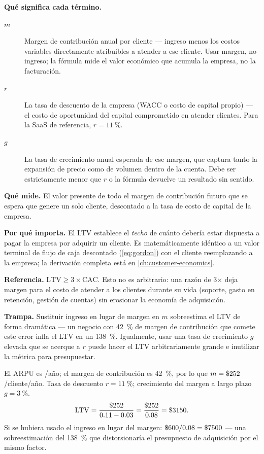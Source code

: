 \textbf{Qué significa cada término.}
\begin{description}
  \item[$m$] Margen de contribución anual por cliente --- ingreso menos los costos variables
    directamente atribuibles a atender a ese cliente. Usar margen, no ingreso; la fórmula
    mide el valor económico que acumula la empresa, no la facturación.
  \item[$r$] La tasa de descuento de la empresa (WACC o costo de capital propio) --- el
    costo de oportunidad del capital comprometido en atender clientes. Para la SaaS de
    referencia, $r = \qty{11}{\percent}$.
  \item[$g$] La tasa de crecimiento anual esperada de ese margen, que captura tanto la
    expansión de precio como de volumen dentro de la cuenta. Debe ser estrictamente menor
    que $r$ o la fórmula devuelve un resultado sin sentido.
\end{description}

\textbf{Qué mide.} El valor presente de todo el margen de contribución futuro que se espera
que genere un solo cliente, descontado a la tasa de costo de capital de la empresa.

\textbf{Por qué importa.} El LTV establece el \emph{techo} de cuánto debería estar dispuesta
a pagar la empresa por adquirir un cliente. Es matemáticamente idéntico a un valor terminal
de flujo de caja descontado (\cref{eq:gordon}) con el cliente reemplazando a la empresa; la
derivación completa está en \cref{ch:customer-economics}.

\textbf{Referencia.} $\mathrm{LTV} \ge 3 \times \mathrm{CAC}$. Esto no es arbitrario: una
razón de 3$\times$ deja margen para el costo de atender a los clientes durante su vida
(soporte, gasto en retención, gestión de cuentas) sin erosionar la economía de adquisición.

\textbf{Trampa.} Sustituir ingreso en lugar de margen en $m$ sobreestima el LTV de forma
dramática --- un negocio con \qty{42}{\percent} de margen de contribución que comete este
error infla el LTV en un \qty{138}{\percent}. Igualmente, usar una tasa de crecimiento $g$
elevada que se acerque a $r$ puede hacer el LTV arbitrariamente grande e inutilizar la
métrica para presupuestar.

\begin{example}
El ARPU es /año; el margen de contribución es \qty{42}{\percent}, por lo que $m =
\$\num{252}$/cliente/año. Tasa de descuento $r = \qty{11}{\percent}$; crecimiento del margen
a largo plazo $g = \qty{3}{\percent}$.
\[
  \mathrm{LTV} = \frac{\$\num{252}}{0.11 - 0.03} = \frac{\$\num{252}}{0.08} = \$\num{3150}.
\]
Si se hubiera usado el ingreso en lugar del margen: $\$\num{600}/0.08 = \$\num{7500}$ --- una
sobreestimación del \qty{138}{\percent} que distorsionaría el presupuesto de adquisición por
el mismo factor.
\end{example}


